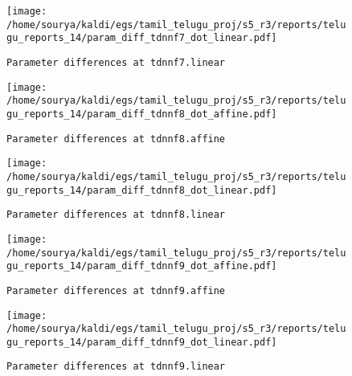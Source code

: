 \documentclass[prl,10pt,twocolumn]{revtex4}
\begin{document}
\newpage
\begin{figure}[h]
  \begin{center}
    \caption{\texttt{Parameter differences at tdnnf7.linear}}
    \texttt{[image: /home/sourya/kaldi/egs/tamil\_telugu\_proj/s5\_r3/reports/telugu\_reports\_14/param\_diff\_tdnnf7\_dot\_linear.pdf]}
  \end{center}
\end{figure}
\clearpage


\newpage
\begin{figure}[h]
  \begin{center}
    \caption{\texttt{Parameter differences at tdnnf8.affine}}
    \texttt{[image: /home/sourya/kaldi/egs/tamil\_telugu\_proj/s5\_r3/reports/telugu\_reports\_14/param\_diff\_tdnnf8\_dot\_affine.pdf]}
  \end{center}
\end{figure}
\clearpage


\newpage
\begin{figure}[h]
  \begin{center}
    \caption{\texttt{Parameter differences at tdnnf8.linear}}
    \texttt{[image: /home/sourya/kaldi/egs/tamil\_telugu\_proj/s5\_r3/reports/telugu\_reports\_14/param\_diff\_tdnnf8\_dot\_linear.pdf]}
  \end{center}
\end{figure}
\clearpage


\newpage
\begin{figure}[h]
  \begin{center}
    \caption{\texttt{Parameter differences at tdnnf9.affine}}
    \texttt{[image: /home/sourya/kaldi/egs/tamil\_telugu\_proj/s5\_r3/reports/telugu\_reports\_14/param\_diff\_tdnnf9\_dot\_affine.pdf]}
  \end{center}
\end{figure}
\clearpage


\newpage
\begin{figure}[h]
  \begin{center}
    \caption{\texttt{Parameter differences at tdnnf9.linear}}
    \texttt{[image: /home/sourya/kaldi/egs/tamil\_telugu\_proj/s5\_r3/reports/telugu\_reports\_14/param\_diff\_tdnnf9\_dot\_linear.pdf]}
  \end{center}
\end{figure}
\clearpage
\end{document}
